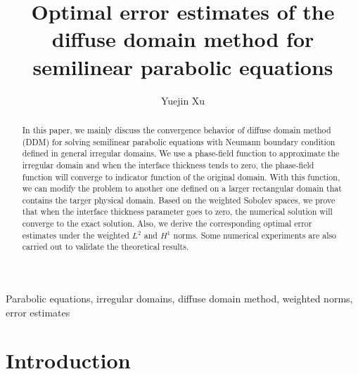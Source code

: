 \documentclass[3p,times]{elsarticle}
\numberwithin{equation}{section}
\begin{document}
	
\begin{frontmatter}
	\title{Optimal error estimates of the diffuse domain method for semilinear parabolic equations}%
	\author[psu]{Yuejin Xu}
	\address[um]{Faculty of Science and Technology, University of Macau, 999078, Macau}
	\begin{abstract}
		In this paper, we mainly discuss the convergence behavior of diffuse domain method (DDM) for solving semilinear parabolic equations with Neumann boundary condition defined in general irregular domains. We use a phase-field function to approximate the irregular domain and when the interface thickness tends to zero, the phase-field function will converge to indicator function of the original domain. With this function, we can modify the problem to another one defined on a larger rectangular domain that contains the targer physical domain. Based on the weighted Sobolev spaces, we prove that when the interface thickness parameter goes to zero, the numerical solution will converge to the exact solution. Also, we derive the corresponding optimal error estimates under the weighted $L^2$ and $H^1$ norms. Some numerical experiments are also carried out to validate the theoretical results.
		
	\end{abstract}
	\begin{keyword}
		Parabolic equations, irregular domains, diffuse domain method, weighted norms, error estimates
	\end{keyword}		
\end{frontmatter}	
	
\section{Introduction}
\end{document}
